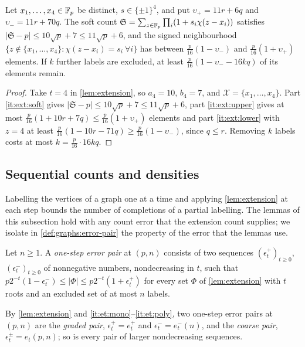 \begin{corollary}\label{lem:record:signed-nbhd}
Let $x_1,\dots,x_4\in\mathbb F_p$ be distinct, $s\in\{\pm1\}^4$, and put
$\upsilon_+=11r+6q$ and $\upsilon_-=11r+70q$. The soft count
$\mathfrak S=\sum_{z\in\mathbb F_p}\prod_i(1+s_i\chi(z-x_i))$ satisfies
$|\mathfrak S-p|\le10\sqrt p+7\le11\sqrt p+6$, and the signed neighbourhood
$\{z\notin\{x_1,\dots,x_4\}:\chi(z-x_i)=s_i\ \forall i\}$ has between
$\frac p{16}(1-\upsilon_-)$ and $\frac p{16}(1+\upsilon_+)$ elements. If $k$
further labels are excluded, at least $\frac p{16}(1-\upsilon_--16kq)$ of its
elements remain.
\end{corollary}

\begin{proof}
Take $t=4$ in \cref{lem:extension}, so $a_4=10$, $b_4=7$, and $\mathcal X=\{x_1,\dots,x_4\}$.
Part \ref{it:ext:soft} gives $|\mathfrak S-p|\le10\sqrt p+7\le11\sqrt p+6$, part
\ref{it:ext:upper} gives at most $\frac p{16}(1+10r+7q)\le\frac p{16}(1+\upsilon_+)$
elements and part \ref{it:ext:lower} with $z=4$ at least
$\frac p{16}(1-10r-71q)\ge\frac p{16}(1-\upsilon_-)$, since $q\le r$. Removing $k$
labels costs at most $k=\frac p{16}\cdot16kq$.
\end{proof}

\subsection{Sequential counts and densities}\label{subsec:labellings:sequential}

Labelling the vertices of a graph one at a time and applying
\cref{lem:extension} at each step bounds the number of completions of a
partial labelling. The lemmas of this subsection hold with any count error
that the extension count supplies; we isolate in \cref{def:graphs:error-pair} the property of the error that the lemmas use.

\begin{definition}\label{def:graphs:error-pair}
Let $n\ge1$. A \emph{one-step error pair} at $(p,n)$ consists of two sequences
$(\epsilon^+_t)_{t\ge0}$, $(\epsilon^-_t)_{t\ge0}$ of nonnegative numbers,
nondecreasing in $t$, such that
$p2^{-t}(1-\epsilon^-_t)\le|\Phi|\le p2^{-t}(1+\epsilon^+_t)$ for every set $\Phi$ of
\cref{lem:extension} with $t$ roots and an excluded set of at most $n$ labels.
\end{definition}

By \cref{lem:extension} and \ref{it:et:mono}--\ref{it:et:poly}, two one-step
error pairs at $(p,n)$ are the \emph{graded pair}, $\epsilon^+_t=e^+_t$ and
$\epsilon^-_t=e^-_t(n)$, and the \emph{coarse pair}, $\epsilon^\pm_t=e_t(p,n)$;
so is every pair of larger nondecreasing sequences.


